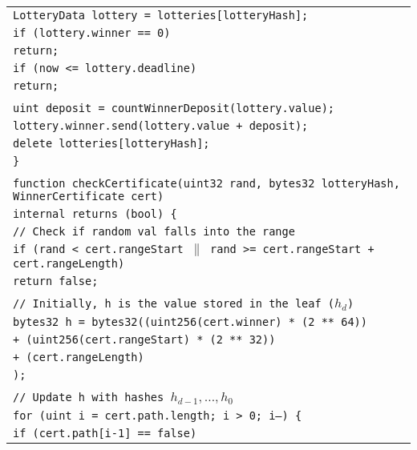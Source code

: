 \documentclass[a4paper]{article}
\begin{document}
\begin{tabularx}{\linewidth}{l}
        \qquad\qquad\texttt{LotteryData lottery = lotteries[lotteryHash];}\\
        \qquad\qquad\texttt{if (lottery.winner == 0)}\\
        \qquad\qquad\qquad\texttt{return;}\\
        \qquad\qquad\texttt{if (now <= lottery.deadline)}\\
        \qquad\qquad\qquad\texttt{return;}\\
        \\
        \qquad\qquad\texttt{uint deposit = countWinnerDeposit(lottery.value);}\\
        \qquad\qquad\texttt{lottery.winner.send(lottery.value + deposit);}\\
        \qquad\qquad\texttt{delete lotteries[lotteryHash];}\\
        \qquad\texttt{\}}\\
        \\
        \qquad\texttt{function checkCertificate(uint32 rand, bytes32 lotteryHash, WinnerCertificate cert)}\\
        \qquad\qquad\qquad\qquad\qquad\qquad\qquad\qquad\texttt{internal returns (bool) \{}\\
        \qquad\qquad\texttt{// Check if~random val falls into~the~range}\\
        \qquad\qquad\texttt{if (rand < cert.rangeStart $\|$ rand >= cert.rangeStart + cert.rangeLength)}\\
        \qquad\qquad\qquad\texttt{return false;}\\
        \\
        \qquad\qquad\texttt{// Initially, h is~the~value stored in~the~leaf ($h_d$)}\\
        \qquad\qquad\texttt{bytes32 h = bytes32((uint256(cert.winner) * (2 ** 64))}\\
        \qquad\qquad\qquad\qquad\qquad\qquad\texttt{+ (uint256(cert.rangeStart) * (2 ** 32))}\\
        \qquad\qquad\qquad\qquad\qquad\qquad\texttt{+ (cert.rangeLength)}\\
        \qquad\qquad\qquad\qquad\qquad\texttt{);}\\
        \\
        \qquad\qquad\texttt{// Update h with~hashes $h_{d-1}, \ldots, h_0$}\\
        \qquad\qquad\texttt{for (uint i = cert.path.length; i > 0; i--) \{}\\
        \qquad\qquad\qquad\texttt{if (cert.path[i-1] == false)}\\

\end{tabularx}
\end{document}
